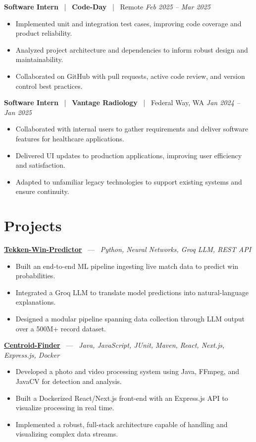 \documentclass[10pt, letterpaper]{article}
\newcommand{\jobhead}[4]{%
  \vspace{5pt}%
  {\bfseries\color{dark}#1}%
  ~{\color{light}|}~%
  {\bfseries\color{navy}#2}%
  ~{\color{light}|}~%
  {\color{light}#3}%
  \hfill{\color{light}\small\textit{#4}}\\[-2pt]%
}
\newcommand{\projhead}[3]{%
  \vspace{5pt}%
  {\bfseries\color{dark}\href{#2}{#1}}%
  ~{\color{light}---}~%
  {\color{light}\small\textit{#3}}\\[-2pt]%
}
\begin{document}
\jobhead{Software Intern}{Code-Day}{Remote}{Feb 2025 – Mar 2025}
\begin{itemize}
  \item Implemented unit and integration test cases, improving code coverage and product reliability.
  \item Analyzed project architecture and dependencies to inform robust design and maintainability.
  \item Collaborated on GitHub with pull requests, active code review, and version control best practices.
\end{itemize}

\jobhead{Software Intern}{Vantage Radiology}{Federal Way, WA}{Jan 2024 – Jan 2025}
\begin{itemize}
  \item Collaborated with internal users to gather requirements and deliver software features for healthcare applications.
  \item Delivered UI updates to production applications, improving user efficiency and satisfaction.
  \item Adapted to unfamiliar legacy technologies to support existing systems and ensure continuity.
\end{itemize}

\section{Projects}

\projhead{Tekken-Win-Predictor}{}{Python, Neural Networks, Groq LLM, REST API}
\begin{itemize}
  \item Built an end-to-end ML pipeline ingesting live match data to predict win probabilities.
  \item Integrated a Groq LLM to translate model predictions into natural-language explanations.
  \item Designed a modular pipeline spanning data collection through LLM output over a 500M+ record dataset.
\end{itemize}

\projhead{Centroid-Finder}{https://github.com/xavierb117/centroid-finder}{Java, JavaScript, JUnit, Maven, React, Next.js, Express.js, Docker}
\begin{itemize}
  \item Developed a photo and video processing system using Java, FFmpeg, and JavaCV for detection and analysis.
  \item Built a Dockerized React/Next.js front-end with an Express.js API to visualize processing in real time.
  \item Implemented a robust, full-stack architecture capable of handling and visualizing complex data streams.
\end{itemize}
\end{document}
